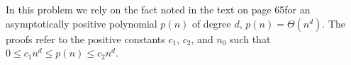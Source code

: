 In this problem we rely on the fact noted in the text on page 65\dash for an asymptotically positive polynomial $p(n)$ of degree $d$, $p(n)=\Theta(n^d)$.
The proofs refer to the positive constants $c_1$, $c_2$, and $n_0$ such that $0\le c_1n^d\le p(n)\le c_2n^d$.
